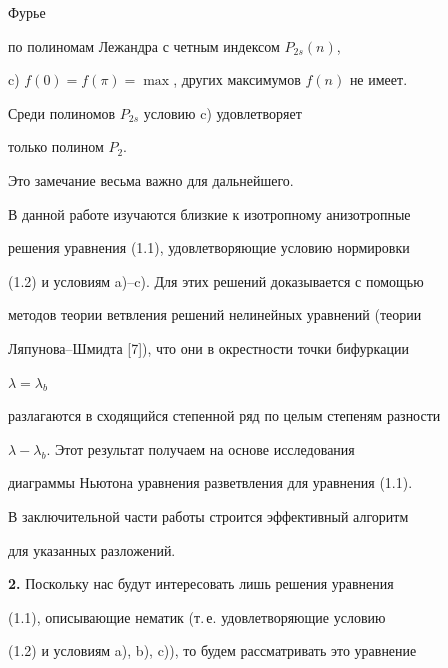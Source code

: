 Фурье  


по полиномам Лежандра с четным индексом $P_{2s}(n)$, 


 


c) $f(0)=f(\pi)=\max$, других максимумов $f(n)$ не имеет. 


 


\begin{note} Среди полиномов $P_{2s}$ условию c) удовлетворяет 


только полином $P_2$. 


\end{note} 


 


Это замечание весьма важно для дальнейшего. 


 


В данной работе изучаются близкие к изотропному анизотропные 


решения уравнения (1.1), удовлетворяющие условию нормировки  


(1.2) и условиям a)--c). Для этих решений доказывается с помощью  


методов теории ветвления решений нелинейных уравнений (теории 


Ляпунова--Шмидта [7]), что они в окрестности точки бифуркации 


$\lambda=\lambda_b$ 


разлагаются в сходящийся степенной ряд по целым степеням разности 


$\lambda-\lambda_b$. Этот результат получаем на основе исследования 


диаграммы Ньютона уравнения разветвления для уравнения (1.1). 


 


В заключительной части работы строится эффективный алгоритм  


для указанных разложений. 


\medskip 


 


{\bf 2.} Поскольку нас будут интересовать лишь решения уравнения 


(1.1), описывающие нематик (т.\,е. удовлетворяющие условию 


(1.2) и условиям a), b), c)), то будем рассматривать это уравнение  


